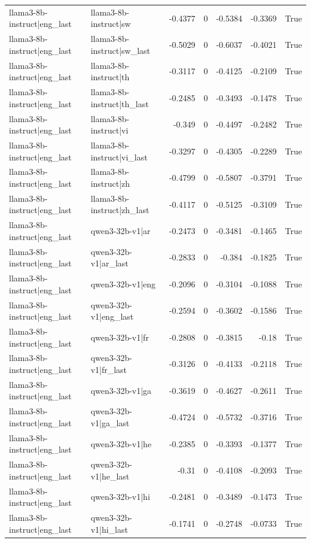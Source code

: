 \begin{table}
\begin{tabular}{l l r r r r l}
llama3-8b-instruct|eng_last & llama3-8b-instruct|sw & -0.4377 & 0 & -0.5384 & -0.3369 & True \\
llama3-8b-instruct|eng_last & llama3-8b-instruct|sw_last & -0.5029 & 0 & -0.6037 & -0.4021 & True \\
llama3-8b-instruct|eng_last & llama3-8b-instruct|th & -0.3117 & 0 & -0.4125 & -0.2109 & True \\
llama3-8b-instruct|eng_last & llama3-8b-instruct|th_last & -0.2485 & 0 & -0.3493 & -0.1478 & True \\
llama3-8b-instruct|eng_last & llama3-8b-instruct|vi & -0.349 & 0 & -0.4497 & -0.2482 & True \\
llama3-8b-instruct|eng_last & llama3-8b-instruct|vi_last & -0.3297 & 0 & -0.4305 & -0.2289 & True \\
llama3-8b-instruct|eng_last & llama3-8b-instruct|zh & -0.4799 & 0 & -0.5807 & -0.3791 & True \\
llama3-8b-instruct|eng_last & llama3-8b-instruct|zh_last & -0.4117 & 0 & -0.5125 & -0.3109 & True \\
llama3-8b-instruct|eng_last & qwen3-32b-v1|ar & -0.2473 & 0 & -0.3481 & -0.1465 & True \\
llama3-8b-instruct|eng_last & qwen3-32b-v1|ar_last & -0.2833 & 0 & -0.384 & -0.1825 & True \\
llama3-8b-instruct|eng_last & qwen3-32b-v1|eng & -0.2096 & 0 & -0.3104 & -0.1088 & True \\
llama3-8b-instruct|eng_last & qwen3-32b-v1|eng_last & -0.2594 & 0 & -0.3602 & -0.1586 & True \\
llama3-8b-instruct|eng_last & qwen3-32b-v1|fr & -0.2808 & 0 & -0.3815 & -0.18 & True \\
llama3-8b-instruct|eng_last & qwen3-32b-v1|fr_last & -0.3126 & 0 & -0.4133 & -0.2118 & True \\
llama3-8b-instruct|eng_last & qwen3-32b-v1|ga & -0.3619 & 0 & -0.4627 & -0.2611 & True \\
llama3-8b-instruct|eng_last & qwen3-32b-v1|ga_last & -0.4724 & 0 & -0.5732 & -0.3716 & True \\
llama3-8b-instruct|eng_last & qwen3-32b-v1|he & -0.2385 & 0 & -0.3393 & -0.1377 & True \\
llama3-8b-instruct|eng_last & qwen3-32b-v1|he_last & -0.31 & 0 & -0.4108 & -0.2093 & True \\
llama3-8b-instruct|eng_last & qwen3-32b-v1|hi & -0.2481 & 0 & -0.3489 & -0.1473 & True \\
llama3-8b-instruct|eng_last & qwen3-32b-v1|hi_last & -0.1741 & 0 & -0.2748 & -0.0733 & True \\

\end{tabular}
\end{table}
